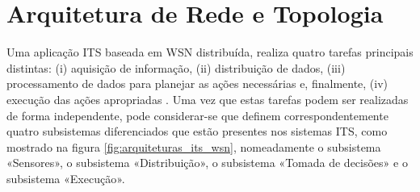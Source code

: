 \documentclass[
	12pt,				%
	oneside,			%
	a4paper,			%
	english,			%
	brazil				%
	]{abntex2ppgsi}
\begin{document}



\section{Arquitetura de Rede e Topologia}

Uma aplicação ITS baseada em WSN distribuída, realiza quatro tarefas principais distintas: (i) aquisição de informação, (ii) distribuição de dados, (iii) processamento de dados para planejar as ações necessárias e, finalmente, (iv) execução das ações apropriadas  \cite{losilla2011comprehensive} . Uma vez que estas tarefas podem ser realizadas de forma independente, pode considerar-se que definem correspondentemente quatro subsistemas diferenciados que estão presentes nos sistemas ITS, como mostrado na figura \ref{fig:arquiteturas_its_wsn}, nomeadamente o subsistema «Sensores», o subsistema «Distribuição», o subsistema «Tomada de decisões» e o subsistema «Execução». 
\end{document}
